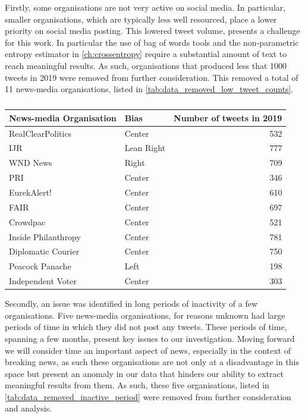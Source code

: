 Firstly, some organisations are not very active on social media. In particular, smaller organisations, which are typically less well resourced, place a lower priority on social media posting. This lowered tweet volume, presents a challenge for this work. In particular the use of bag of words tools and the non-parametric entropy estimator in \autoref{ch:crossentropy} require a substantial amount of text to reach meaningful results. As such, organisations that produced less that 1000 tweets in 2019 were removed from further consideration. This removed a total of 11 news-media organisations, listed in  \autoref{tab:data_removed_low_tweet_counts}.


\begin{table} 
	\begin{tabular}{llr}
		\toprule
		News-media Organisation &    Bias  &  Number of tweets in 2019\\
		\midrule
		RealClearPolitics &      Center &  532 \\
		IJR  &  Lean Right &  777 \\
		WND News &         Right &  709 \\
		PRI &                Center &  346 \\
		EurekAlert! &            Center &  610 \\
		FAIR &     Center &  697 \\
		Crowdpac &            Center &  521 \\
		Inside Philanthropy &        Center &  781 \\
		Diplomatic Courier &         Center &  750 \\
		Peacock Panache &          Left &  198 \\
		Independent Voter &            Center &  303 \\
		\bottomrule
	\end{tabular}
\caption{\todo{}}
\label{tab:data_removed_low_tweet_counts}
\end{table}

Secondly, an issue was identified in long periods of inactivity of a few organisations. Five news-media organisations, for reasons unknown had large periods of time in which they did not post any tweets. These periods of time, spanning a few months, present key issues to our investigation. Moving forward we will consider time an important aspect of news, especially in the context of breaking news, as such these organisations are not only at a disadvantage in this space but present an anomaly in our data that hinders our ability to extract meaningful results from them. As such, these five organisations, listed in \autoref{tab:data_removed_inactive_period} were removed from further consideration and analysis.

